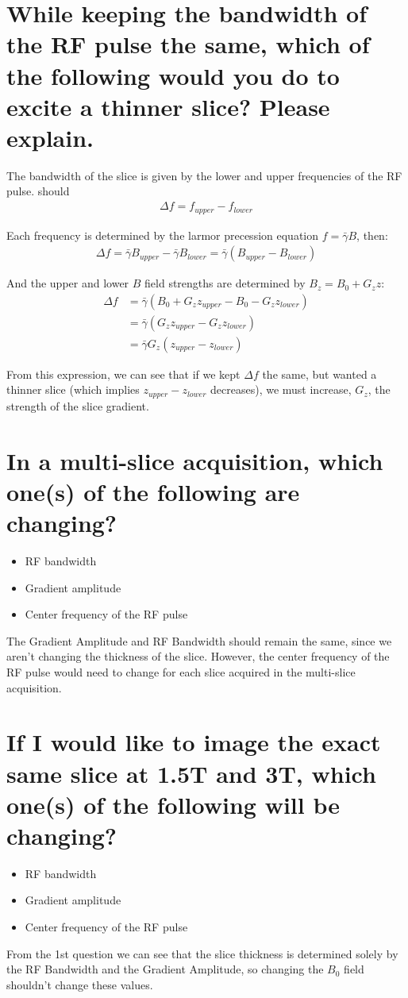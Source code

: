 \documentclass{article}
\begin{document}
\section{While keeping the bandwidth of the RF pulse the same, which of the following would you do to excite a thinner slice? Please explain.}
The bandwidth of the slice is given by the lower and upper frequencies of the RF pulse. should
\begin{align*}
    \Delta f = f_{upper} - f_{lower}
\end{align*}

Each frequency is determined by the larmor precession equation $f = \bar{\gamma}B$, then:
\begin{align*}
    \Delta f = \bar{\gamma}B_{upper} - \bar{\gamma}B_{lower} = \bar{\gamma}\left(B_{upper} - B_{lower}\right)
\end{align*}

And the upper and lower $B$ field strengths are determined by $B_{z} = B_0 + G_z z$:
\begin{align*}
    \Delta f &= \bar{\gamma}\left(B_0 + G_z z_{upper} - B_0 - G_z z_{lower}\right) \\
    &= \bar{\gamma}\left(G_z z_{upper} - G_z z_{lower}\right) \\
    &= \bar{\gamma}G_z\left(z_{upper} - z_{lower}\right)
\end{align*}

From this expression, we can see that if we kept $\Delta f$ the same, but wanted a thinner slice
(which implies $z_{upper} - z_{lower}$ decreases), we must increase, $G_z$, the strength of the slice
gradient.

\section{In a multi-slice acquisition, which one(s) of the following are changing?}
\begin{itemize}
    \item RF bandwidth
    \item Gradient amplitude
    \item Center frequency of the RF pulse
\end{itemize}
The Gradient Amplitude and RF Bandwidth should remain the same, since we aren't changing the thickness of the
slice. However, the center frequency of the RF pulse would need to change for each slice acquired in the multi-slice
acquisition.

\section{If I would like to image the exact same slice at 1.5T and 3T, which one(s) of the following will be changing?}
\begin{itemize}
    \item RF bandwidth
    \item Gradient amplitude
    \item Center frequency of the RF pulse
\end{itemize}
From the 1st question we can see that the slice thickness is determined solely by the
RF Bandwidth and the Gradient Amplitude, so changing the $B_0$ field shouldn't change these values.
\end{document}
